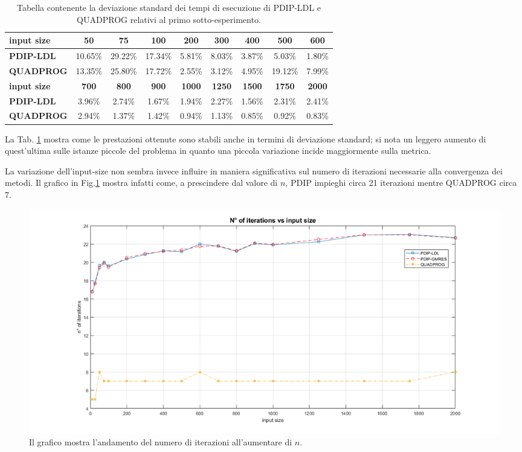     
\begin{table}[!h]
\centering
\begin{tabular}{|l|c|c|c|c|c|c|c|c|}\hline
\textbf{input size} & \textbf{50}  & \textbf{75}  & \textbf{100} & \textbf{200}  & \textbf{300}  & \textbf{400}  & \textbf{500}  & \textbf{600}  \\\hline
\textbf{PDIP-LDL}   & 10.65\%      & 29.22\%      & 17.34\%      & 5.81\%        & 8.03\%        & 3.87\%        & 5.03\%        & 1.80\%        \\
\textbf{QUADPROG}   & 13.35\%      & 25.80\%      & 17.72\%      & 2.55\%        & 3.12\%        & 4.95\%        & 19.12\%       & 7.99\%        \\\hline
\textbf{input size} & \textbf{700} & \textbf{800} & \textbf{900} & \textbf{1000} & \textbf{1250} & \textbf{1500} & \textbf{1750} & \textbf{2000} \\\hline
\textbf{PDIP-LDL}   & 3.96\%       & 2.74\%       & 1.67\%       & 1.94\%        & 2.27\%        & 1.56\%        & 2.31\%        & 2.41\%        \\
\textbf{QUADPROG}   & 2.94\%       & 1.37\%       & 1.42\%       & 0.94\%        & 1.13\%        & 0.85\%        & 0.92\%        & 0.83\%     \\  \hline
\end{tabular}
    \caption{Tabella contenente la deviazione standard dei tempi di esecuzione di PDIP-LDL e QUADPROG relativi al primo sotto-esperimento. \label{tab:ldlqp1.1}}
\end{table}

La Tab. \ref{tab:ldlqp1.1} mostra come le prestazioni ottenute sono stabili anche in termini di deviazione standard; si nota un leggero aumento di quest'ultima sulle istanze piccole del problema in quanto una piccola variazione incide maggiormente sulla metrica.

La variazione dell'input-size non sembra invece influire in maniera significativa sul  numero di iterazioni necessarie alla convergenza dei metodi.
Il grafico in Fig.\ref{fig:exp1.2} mostra infatti come, a prescindere dal valore di $n$, PDIP impieghi circa 21 iterazioni mentre QUADPROG circa 7.

\begin{figure}[!h]
    \centering
    \includegraphics[width=\textwidth]{img/MU7.png}
    \caption{Il grafico mostra l'andamento del numero di iterazioni all'aumentare di $n$. \label{fig:exp1.2}}
\end{figure}

